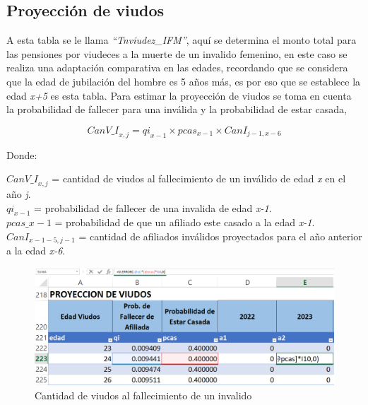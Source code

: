\documentclass[
  letterpaper,
  DIV=11,
  numbers=noendperiod]{scrreprt}
\begin{document}
\hypertarget{proyecciuxf3n-de-viudos-2}{%
\subsection{Proyección de viudos}\label{proyecciuxf3n-de-viudos-2}}

A esta tabla se le llama \emph{``Tnviudez\_IFM''}, aquí se determina el
monto total para las pensiones por viudeces a la muerte de un invalido
femenino, en este caso se realiza una adaptación comparativa en las
edades, recordando que se considera que la edad de jubilación del hombre
es 5 años más, es por eso que se establece la edad \emph{x+5} es esta
tabla. Para estimar la proyección de viudos se toma en cuenta la
probabilidad de fallecer para una inválida y la probabilidad de estar
casada,

\begin{equation}
Can{V\_I}_{x,j}={qi}_{x-1}\times pcas_{x-1}\times{CanI}_{j-1,x-6}
\end{equation}

Donde:

\(Can{V\_I}_{x,j}\) = cantidad de viudos al fallecimiento de un inválido
de edad \emph{x} en el año \emph{j}.\\
\({qi}_{x-1}\) = probabilidad de fallecer de una invalida de edad
\emph{x-1}.\\
\(pcas\_{x-1}\) = probabilidad de que un afiliado este casado a la edad
\emph{x-1}.\\
\({CanI}_{x-1-5,j-1}\) = cantidad de afiliados inválidos proyectados
para el año anterior a la edad \emph{x-6}.

\begin{figure}

{\centering \includegraphics{images/F/Img38.png}

}

\caption{Cantidad de viudos al fallecimiento de un invalido}

\end{figure}
\end{document}
